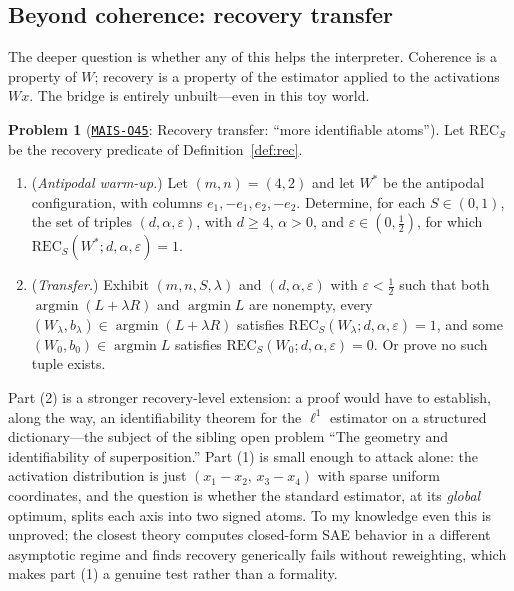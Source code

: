 \documentclass[11pt]{amsart}
\newcommand{\Oid}[1]{\href{https://github.com/lionellevine/MAIS/blob/main/open-problems/MAIS-O#1.md}{\texttt{MAIS-O#1}}}
\theoremstyle{plain}
\theoremstyle{definition}
\newtheorem{problem}[theorem]{Problem}
\begin{document}
\subsection{Beyond coherence: recovery transfer}

The deeper question is whether any of this helps the interpreter. Coherence is a property of $W$; recovery is a property of the estimator applied to the activations $Wx$. The bridge is entirely unbuilt---even in this toy world.

\begin{problem}[\Oid{45}: Recovery transfer: ``more identifiable atoms'']\label{prob:transfer}
Let $\mathrm{REC}_S$ be the recovery predicate of Definition~\ref{def:rec}.
\begin{enumerate}
\item (\emph{Antipodal warm-up.}) Let $(m,n)=(4,2)$ and let $W^*$ be the antipodal configuration, with columns $e_1,-e_1,e_2,-e_2$. Determine, for each $S\in(0,1)$, the set of triples $(d,\alpha,\varepsilon)$, with $d\ge4$, $\alpha>0$, and $\varepsilon\in(0,\tfrac12)$, for which $\mathrm{REC}_S(W^*;d,\alpha,\varepsilon)=1$.
\item (\emph{Transfer.}) Exhibit $(m,n,S,\lambda)$ and $(d,\alpha,\varepsilon)$ with $\varepsilon<\tfrac12$ such that both $\operatorname{argmin}(L+\lambda R)$ and $\operatorname{argmin}L$ are nonempty, every $(W_\lambda,b_\lambda)\in\operatorname{argmin}(L+\lambda R)$ satisfies $\mathrm{REC}_S(W_\lambda;d,\alpha,\varepsilon)=1$, and some $(W_0,b_0)\in\operatorname{argmin} L$ satisfies $\mathrm{REC}_S(W_0;d,\alpha,\varepsilon)=0$. Or prove no such tuple exists.
\end{enumerate}
\end{problem}

Part (2) is a stronger recovery-level extension: a proof would have to establish, along the way, an identifiability theorem for the $\ell^1$ estimator on a structured dictionary---the subject of the sibling open problem ``The geometry and identifiability of superposition.'' Part (1) is small enough to attack alone: the activation distribution is just $(x_1-x_2,\,x_3-x_4)$ with sparse uniform coordinates, and the question is whether the standard estimator, at its \emph{global} optimum, splits each axis into two signed atoms. To my knowledge even this is unproved; the closest theory \cite{cui2025} computes closed-form SAE behavior in a different asymptotic regime and finds recovery generically fails without reweighting, which makes part (1) a genuine test rather than a formality.
\end{document}
